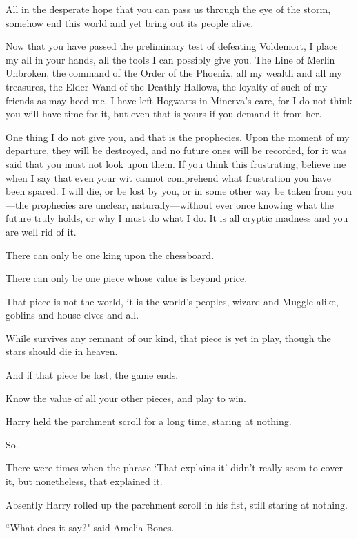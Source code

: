 \begin{writtenNote}
All in the desperate hope that you can pass us through the eye of the storm, somehow end this world and yet bring out its people alive.

Now that you have passed the preliminary test of defeating Voldemort, I place my all in your hands, all the tools I can possibly give you. The Line of Merlin Unbroken, the command of the Order of the Phoenix, all my wealth and all my treasures, the Elder Wand of the Deathly Hallows, the loyalty of such of my friends as may heed me. I have left Hogwarts in Minerva's care, for I do not think you will have time for it, but even that is yours if you demand it from her.

One thing I do not give you, and that is the prophecies. Upon the moment of my departure, they will be destroyed, and no future ones will be recorded, for it was said that you must not look upon them. If you think this frustrating, believe me when I say that even your wit cannot comprehend what frustration you have been spared. I will die, or be lost by you, or in some other way be taken from you---the prophecies are unclear, naturally---without ever once knowing what the future truly holds, or why I must do what I do. It is all cryptic madness and you are well rid of it.

There can only be one king upon the chessboard.

There can only be one piece whose value is beyond price.

That piece is not the world, it is the world's peoples, wizard and Muggle alike, goblins and house elves and all.

While survives any remnant of our kind, that piece is yet in play, though the stars should die in heaven.

And if that piece be lost, the game ends.

Know the value of all your other pieces, and play to win.

\end{writtenNote}

\later

Harry held the parchment scroll for a long time, staring at nothing.

So.

There were times when the phrase `That explains it' didn't really seem to cover it, but nonetheless, that explained it.

Absently Harry rolled up the parchment scroll in his fist, still staring at nothing.

``What does it say?" said Amelia Bones.


